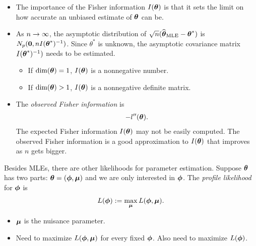    \begin{frame}

  \begin{itemize}
    \item The importance of the Fisher information $I(\boldsymbol{\theta})$ is
  that it sets the limit on how accurate an unbiased estimate of
  $\boldsymbol{\theta}$ can be.

    \item As $n\to\infty$, the asymptotic distribution of
  $\sqrt{n}(\widehat{\boldsymbol{\theta}}_{\rm MLE}-\boldsymbol{\theta}^*)$ is $N_p(\boldsymbol{0},
  nI(\boldsymbol{\theta}^*)^{-1})$. Since $\theta^*$ is unknown, the asymptotic covariance matrix $I(\boldsymbol{\theta}^*)^{-1})$ needs to be estimated.
  \begin{itemize}
  \item If $\dim(\boldsymbol{\theta})=1$, $I(\boldsymbol{\theta})$ is a nonnegative
    number.
  \item If $\dim(\boldsymbol{\theta})>1$, $I(\boldsymbol{\theta})$ is a nonnegative
    definite matrix.
  \end{itemize}

    \item The \emph{observed Fisher information\/} is
  \begin{align*}
    -l''(\boldsymbol{\theta}).
  \end{align*}
  The expected Fisher information $I(\boldsymbol{\theta})$ may not be easily computed. The observed Fisher information is a good approximation to $I(\boldsymbol{\theta})$ that improves as $n$ gets bigger.
  \end{itemize}


  \end{frame}

  \begin{frame}
  Besides MLEs, there are other likelihoods for parameter estimation.
  Suppose $\boldsymbol{\theta}$ has two parts: $\boldsymbol{\theta} = (\boldsymbol{\phi},\boldsymbol{\mu})$
  and we are only interested in $\boldsymbol{\phi}$.  The \emph{profile
    likelihood\/} for $\boldsymbol{\phi}$ is
  \begin{align*}
    L(\boldsymbol{\phi}) := \max_{\boldsymbol{\mu}} L(\boldsymbol{\phi},\boldsymbol{\mu}).
  \end{align*}
  \begin{itemize}
  \item $\boldsymbol{\mu}$ is the nuisance parameter.
  \item Need to maximize $L(\boldsymbol{\phi}, \boldsymbol{\mu})$ for every fixed
    $\boldsymbol{\phi}$.  Also need to maximize $L(\boldsymbol{\phi})$.
  \end{itemize}



  \end{frame}





